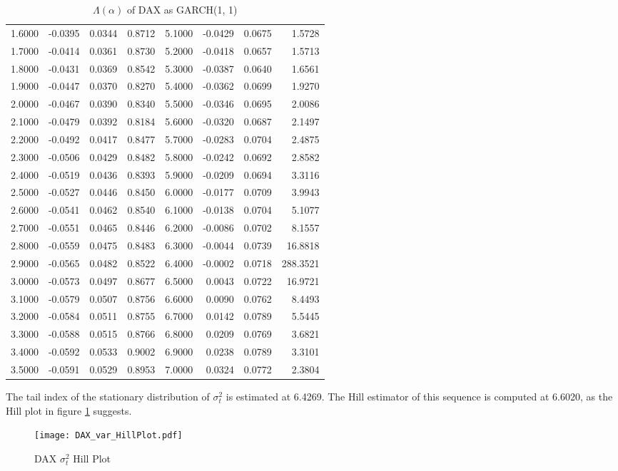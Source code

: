 \documentclass{article}
\theoremstyle{remark}
\begin{document}
\begin{itemize}
\begin{table}[htb!]
\begin{tabular}{r|r|r|r||r|r|r|r}
      1.6000 & -0.0395 & 0.0344 & 0.8712 & 5.1000 & -0.0429 & 0.0675 & 1.5728 \\
      1.7000 & -0.0414 & 0.0361 & 0.8730 & 5.2000 & -0.0418 & 0.0657 & 1.5713 \\
      1.8000 & -0.0431 & 0.0369 & 0.8542 & 5.3000 & -0.0387 & 0.0640 & 1.6561 \\
      1.9000 & -0.0447 & 0.0370 & 0.8270 & 5.4000 & -0.0362 & 0.0699 & 1.9270 \\
      2.0000 & -0.0467 & 0.0390 & 0.8340 & 5.5000 & -0.0346 & 0.0695 & 2.0086 \\
      2.1000 & -0.0479 & 0.0392 & 0.8184 & 5.6000 & -0.0320 & 0.0687 & 2.1497 \\
      2.2000 & -0.0492 & 0.0417 & 0.8477 & 5.7000 & -0.0283 & 0.0704 & 2.4875 \\
      2.3000 & -0.0506 & 0.0429 & 0.8482 & 5.8000 & -0.0242 & 0.0692 & 2.8582 \\
      2.4000 & -0.0519 & 0.0436 & 0.8393 & 5.9000 & -0.0209 & 0.0694 & 3.3116 \\
      2.5000 & -0.0527 & 0.0446 & 0.8450 & 6.0000 & -0.0177 & 0.0709 & 3.9943 \\
      2.6000 & -0.0541 & 0.0462 & 0.8540 & 6.1000 & -0.0138 & 0.0704 & 5.1077 \\
      2.7000 & -0.0551 & 0.0465 & 0.8446 & 6.2000 & -0.0086 & 0.0702 & 8.1557 \\
      2.8000 & -0.0559 & 0.0475 & 0.8483 & 6.3000 & -0.0044 & 0.0739 & 16.8818 \\
      2.9000 & -0.0565 & 0.0482 & 0.8522 & 6.4000 & -0.0002 & 0.0718 & 288.3521 \\
      3.0000 & -0.0573 & 0.0497 & 0.8677 & 6.5000 &  0.0043 & 0.0722 & 16.9721 \\
      3.1000 & -0.0579 & 0.0507 & 0.8756 & 6.6000 &  0.0090 & 0.0762 & 8.4493 \\
      3.2000 & -0.0584 & 0.0511 & 0.8755 & 6.7000 &  0.0142 & 0.0789 & 5.5445 \\
      3.3000 & -0.0588 & 0.0515 & 0.8766 & 6.8000 &  0.0209 & 0.0769 & 3.6821 \\
      3.4000 & -0.0592 & 0.0533 & 0.9002 & 6.9000 &  0.0238 & 0.0789 & 3.3101 \\
      3.5000 & -0.0591 & 0.0529 & 0.8953 & 7.0000 &  0.0324 & 0.0772 & 2.3804 \\
    \end{tabular}
    \caption{$\Lambda(\alpha)$ of DAX as GARCH(1, 1)}
    \label{tab:DAX_garch11_Lambda}
  \end{table}
  The tail index of the stationary distribution of $\sigma_t^2$ is
  estimated at 6.4269. The Hill estimator of this
  sequence is computed at 6.6020, as the Hill plot in figure
  \ref{fig:DAX_var_HillPlot} suggests.
  \begin{figure}[htb!]
    \centering
    \texttt{[image: DAX\_var\_HillPlot.pdf]}    
    \caption{DAX $\sigma_t^2$ Hill Plot}
    \label{fig:DAX_var_HillPlot}
  \end{figure}


\end{itemize}
\end{document}

